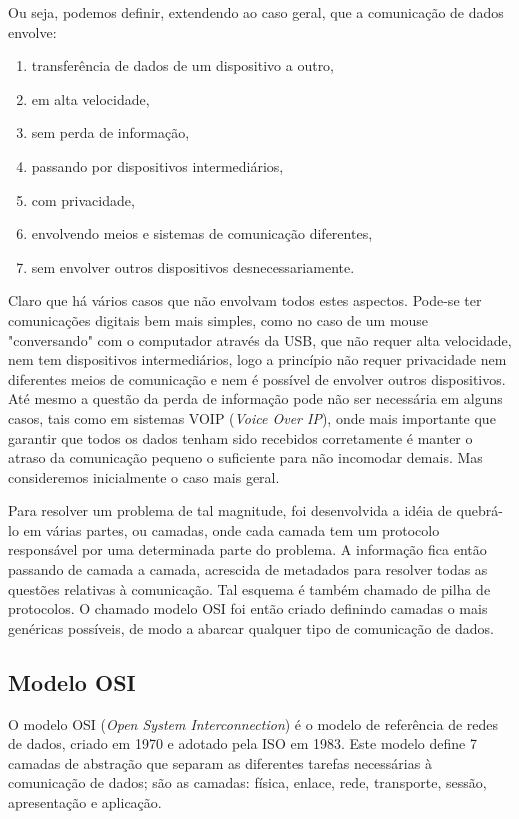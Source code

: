 Ou seja, podemos definir, extendendo ao caso geral, que a comunicação de dados envolve:
\begin{enumerate}
	\item transferência de dados de um dispositivo a outro,
	\item em alta velocidade,
	\item sem perda de informação,
	\item passando por dispositivos intermediários,
	\item com privacidade,
	\item envolvendo meios e sistemas de comunicação diferentes,
	\item sem envolver outros dispositivos desnecessariamente.
\end{enumerate}

Claro que há vários casos que não envolvam todos estes aspectos. Pode-se ter comunicações digitais bem mais simples, como no caso de um mouse "conversando" com o computador através da USB, que não requer alta velocidade, nem tem dispositivos intermediários, logo a princípio não requer privacidade nem diferentes meios de comunicação e nem é possível de envolver outros dispositivos. Até mesmo a questão da perda de informação pode não ser necessária em alguns casos, tais como em sistemas VOIP (\emph{Voice Over IP}), onde mais importante que garantir que todos os dados tenham sido recebidos corretamente é manter o atraso da comunicação pequeno o suficiente para não incomodar demais. Mas consideremos inicialmente o caso mais geral.

Para resolver um problema de tal magnitude, foi desenvolvida a idéia de quebrá-lo em várias partes, ou camadas, onde cada camada tem um protocolo responsável por uma determinada parte do problema. A informação fica então passando de camada a camada, acrescida de metadados para resolver todas as questões relativas à comunicação. Tal esquema é também chamado de pilha de protocolos. O chamado modelo OSI foi então criado definindo camadas o mais genéricas possíveis, de modo a abarcar qualquer tipo de comunicação de dados.

\subsection{Modelo OSI}
O modelo OSI (\emph{Open System Interconnection}) é o modelo de referência de redes de dados, criado em 1970 e adotado pela ISO em 1983. Este modelo define 7 camadas de abstração que separam as diferentes tarefas necessárias à comunicação de dados; são as camadas: física, enlace, rede, transporte, sessão, apresentação e aplicação.

